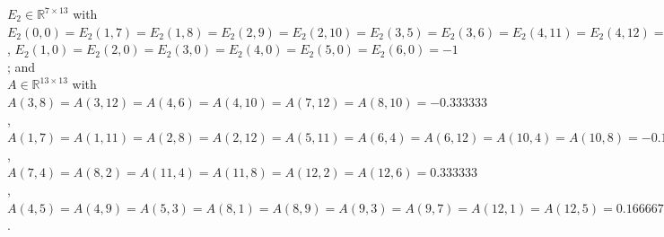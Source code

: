 \documentclass{article} %
\begin{document}
 $E_2 \in \mathbb{R}^{7 \times 13}$ with
$E_2(0,0) = E_2(1,7) = E_2(1,8) = E_2(2,9) = E_2(2,10) = E_2(3,5) =
E_2(3,6) = E_2(4,11) = E_2(4,12) = E_2(5,1) = E_2(5,2) = E_2(6,3) =
E_2(6,4) = {1}$, $E_2(1,0) = E_2(2,0) = E_2(3,0) = E_2(4,0) =
E_2(5,0) = E_2(6,0) = {-1}$; and \\

 $A \in \mathbb{R}^{13 \times
  13}$ with $A(3,8) = A(3,12) = A(4,6) = A(4,10) = A(7,12) = A(8,10) =
{-0.333333}$, $A(1,7) = A(1,11) = A(2,8) = A(2,12) = A(5,11) =
A(6,4) = A(6,12) = A(10,4) = A(10,8) = {-0.166667}$, $A(7,4) =
A(8,2) = A(11,4) = A(11,8) = A(12,2) = A(12,6) = {0.333333}$,
$A(4,5) = A(4,9) = A(5,3) = A(8,1) = A(8,9) = A(9,3) = A(9,7) =
A(12,1) = A(12,5) = {0.166667}$.\\





\end{document}
